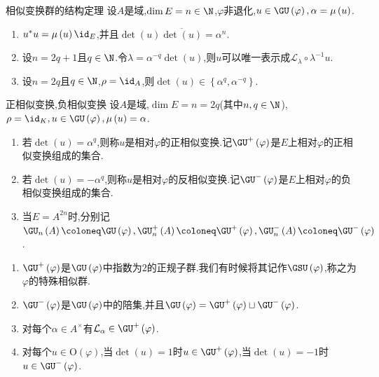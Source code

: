 \begin{theorem}{相似变换群的结构定理}{}
	设$A$是域,$\dim E=n\in\N$,$\varphi$非退化,$u\in\GU\left(\varphi\right),\alpha=\mu\left(u\right)$.
	\begin{enumerate}
		\item $u^{\ast}u=\mu\left(u\right)\id_{E}$,并且$\det\left(u\right)\overline{\det\left(u\right)}=\alpha^{n}$.
		\item 设$n=2q+1$且$q\in\N$.令$\lambda=\alpha^{-q}\det\left(u\right)$,则$u$可以唯一表示成$\mathcal{L}_{\lambda}\circ\lambda^{-1}u$.
		\item 设$n=2q$且$q\in\N$,$\rho=\id_{A}$,则$\det\left(u\right)\in\left\{\alpha^{q},\alpha^{-q}\right\}$.
	\end{enumerate}
\end{theorem}

\begin{definition}{正相似变换,负相似变换}{}
	设$A$是域,$\dim E=n=2q$(其中$n,q\in\N$),$\rho=\id_{K},u\in\GU\left(\varphi\right),\mu\left(u\right)=\alpha$.
	\begin{enumerate}
		\item 若$\det\left(u\right)=\alpha^{q}$,则称$u$是相对$\varphi$的正相似变换.记$\GU^{+}\left(\varphi\right)$是$E$上相对$\varphi$的正相似变换组成的集合.
		\item 若$\det\left(u\right)=-\alpha^{q}$,则称$u$是相对$\varphi$的反相似变换.记$\GU^{-}\left(\varphi\right)$是$E$上相对$\varphi$的负相似变换组成的集合.
		\item 当$E=A^{2n}$时,分别记$\GU_{n}\left(A\right)\coloneq\GU\left(\varphi\right),\GU_{n}^{+}\left(A\right)\coloneq\GU^{+}\left(\varphi\right),\GU_{n}^{-}\left(A\right)\coloneq\GU^{-}\left(\varphi\right)$.
	\end{enumerate}
\end{definition}

\begin{remark}{}{}
	\begin{enumerate}
		\item $\GU^{+}\left(\varphi\right)$是$\GU\left(\varphi\right)$中指数为$2$的正规子群.我们有时候将其记作$\GSU\left(\varphi\right)$,称之为$\varphi$的特殊相似群.
		\item $\GU^{-}\left(\varphi\right)$是$\GU\left(\varphi\right)$中的陪集,并且$\GU\left(\varphi\right)=\GU^{+}\left(\varphi\right)\sqcup\GU^{-}\left(\varphi\right)$.
		\item 对每个$\alpha\in A^{\times}$有$\mathcal{L}_{\alpha}\in\GU^{+}\left(\varphi\right)$.
		\item 对每个$u\in\mathrm{O}\left(\varphi\right)$,当$\det\left(u\right)=1$时$u\in\GU^{+}\left(\varphi\right)$,当$\det\left(u\right)=-1$时$u\in\GU^{-}\left(\varphi\right)$.
	\end{enumerate}
\end{remark}

